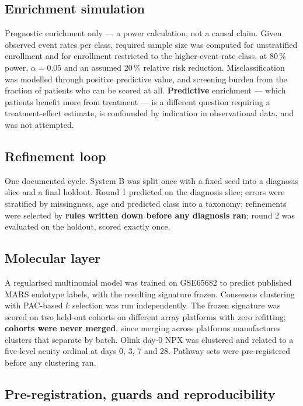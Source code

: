 \documentclass[11pt,letterpaper]{article}
\begin{document}
\subsection{Enrichment simulation}

Prognostic enrichment only --- a power calculation, not a causal claim. Given observed event
rates per class, required sample size was computed for unstratified enrollment and for
enrollment restricted to the higher-event-rate class, at 80\,\% power, $\alpha = 0.05$ and an
assumed 20\,\% relative risk reduction. Misclassification was modelled through positive
predictive value, and screening burden from the fraction of patients who can be scored at
all. \textbf{Predictive} enrichment --- which patients benefit more from treatment --- is a
different question requiring a treatment-effect estimate, is confounded by indication in
observational data, and was not attempted.

\subsection{Refinement loop}

One documented cycle. System B was split once with a fixed seed into a diagnosis slice and a
final holdout. Round 1 predicted on the diagnosis slice; errors were stratified by
missingness, age and predicted class into a taxonomy; refinements were selected by
\textbf{rules written down before any diagnosis ran}; round 2 was evaluated on the holdout,
scored exactly once.

\subsection{Molecular layer}

A regularised multinomial model was trained on GSE65682 to predict published MARS endotype
labels, with the resulting signature frozen. Consensus clustering with PAC-based $k$
selection was run independently. The frozen signature was scored on two held-out cohorts on
different array platforms with zero refitting; \textbf{cohorts were never merged}, since
merging across platforms manufactures clusters that separate by batch. Olink day-0 NPX was
clustered and related to a five-level acuity ordinal at days 0, 3, 7 and 28. Pathway sets
were pre-registered before any clustering ran.

\subsection{Pre-registration, guards and reproducibility}
\end{document}
